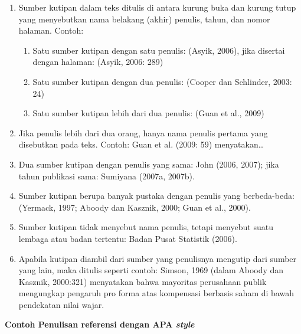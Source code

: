 \begin{enumerate}[leftmargin=1.6cm,label=\alph*.]
    \item Sumber kutipan dalam teks ditulis di antara kurung buka dan kurung tutup yang
          menyebutkan nama belakang (akhir) penulis, tahun, dan nomor halaman. Contoh:
          \begin{enumerate}[leftmargin=1cm,label=\arabic*.]
              \item Satu sumber kutipan dengan satu penulis: (Asyik, 2006), jika disertai
                    dengan halaman: (Asyik, 2006: 289)
              \item Satu sumber kutipan dengan dua penulis: (Cooper dan Schlinder, 2003: 24)
              \item Satu sumber kutipan lebih dari dua penulis: (Guan et al., 2009)
          \end{enumerate}
    \item Jika penulis lebih dari dua orang, hanya nama penulis pertama yang disebutkan pada
          teks. Contoh: Guan et al. (2009: 59) menyatakan\ldots
    \item Dua sumber kutipan dengan penulis yang sama: John (2006, 2007); jika tahun
          publikasi sama: Sumiyana (2007a, 2007b).
    \item Sumber kutipan berupa banyak pustaka dengan penulis yang berbeda-beda:
          (Yermack, 1997; Aboody dan Kasznik, 2000; Guan et al., 2000).
    \item Sumber kutipan tidak menyebut nama penulis, tetapi menyebut suatu lembaga atau
          badan tertentu: Badan Pusat Statistik (2006).
    \item Apabila kutipan diambil dari sumber yang penulisnya mengutip dari sumber yang
          lain, maka ditulis seperti contoh: Simson, 1969 (dalam Aboody dan Kasznik,
          2000:321) menyatakan bahwa mayoritas perusahaan publik mengungkap pengaruh
          pro forma atas kompensasi berbasis saham di bawah pendekatan nilai wajar.
\end{enumerate}

\vspace{10pt}
\begin{center}
    \textbf{Contoh Penulisan referensi dengan APA \textit{style}}
\end{center}

